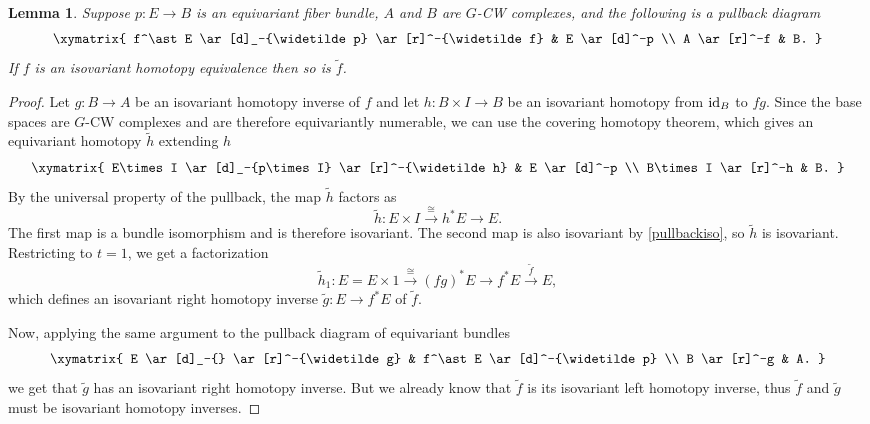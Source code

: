 \documentclass[11pt]{amsart}
\newtheorem{lem}{Lemma}[section]
\theoremstyle{definition}
\numberwithin{equation}{section}
\numberwithin{figure}{section}
\newcommand{\id}{\textup{id}}
\newcommand{\ti}{\widetilde}
\begin{document}
\begin{lem}\label{bundlelemma}
Suppose $p\colon E\to B$ is an equivariant fiber bundle, $A$ and $B$ are $G$-CW complexes, and the following  is a pullback diagram
\[ \xymatrix{
	f^\ast E \ar[d]_-{\ti p} \ar[r]^-{\ti f} & E \ar[d]^-p \\
	A \ar[r]^-f & B.
} \]
 If $f$ is an isovariant homotopy equivalence then so is $\ti f$. %
\end{lem}

\begin{proof}
Let $g\colon B\to A$ be an isovariant  homotopy inverse of $f$ and let $h\colon B\times I\to B$ be an isovariant homotopy from $\id_B$ to $fg$. Since the base spaces are $G$-CW complexes and are therefore equivariantly numerable, we can use the covering homotopy theorem, which gives an equivariant homotopy $\ti h$ extending $h$
\[ \xymatrix{
	E\times I \ar[d]_-{p\times I} \ar[r]^-{\ti h} & E \ar[d]^-p \\
	B\times I \ar[r]^-h & B.
} \] 
By the universal property of the pullback, the map $\ti h$ factors as
$$\ti h\colon E\times I\xrightarrow{\cong} h^\ast E \to E.$$
The first map is a bundle isomorphism and is therefore isovariant. The second map is also isovariant by \autoref{pullbackiso}, so $\ti h$ is isovariant. Restricting to $t=1$, we get a factorization
$$\ti h_1\colon E=E\times 1\xrightarrow{\cong} (fg)^\ast E\rightarrow f^\ast E \xrightarrow{\ti f} E,$$
which defines an isovariant right homotopy inverse $\ti g\colon E \to f^\ast E$ of $\ti f$.

Now, applying the same argument to the pullback diagram of equivariant bundles 
\[ \xymatrix{
	 E \ar[d]_-{} \ar[r]^-{\ti g} & f^\ast E \ar[d]^-{\ti p} \\
	B \ar[r]^-g & A.
} \]
we get that $\ti g$ has an isovariant right homotopy inverse. But we already know that $\ti f$ is its isovariant left homotopy inverse, thus $\ti f$ and $\ti g$ must be isovariant homotopy inverses.
%
\end{proof}
\end{document}
